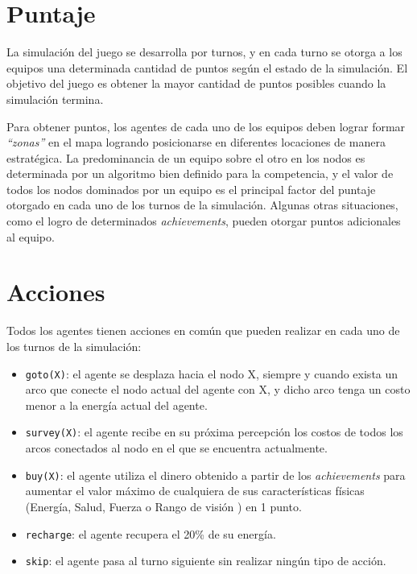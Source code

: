 \section{Puntaje}

La simulación del juego se desarrolla por turnos, y en cada turno se otorga 
a los equipos una determinada cantidad de puntos según el estado de la 
simulación. El objetivo del juego es obtener la mayor cantidad de puntos 
posibles cuando la simulación termina.

Para obtener puntos, los agentes de cada uno de los equipos deben lograr 
formar \textit{``zonas''} en el mapa logrando posicionarse en diferentes 
locaciones de manera estratégica. La predominancia de un equipo sobre el 
otro en los nodos es determinada por un algoritmo bien definido para la 
competencia, y el valor de todos los nodos dominados por un equipo es el 
principal factor del puntaje otorgado en cada uno de los turnos de la 
simulación. Algunas otras situaciones, como el logro de determinados 
\textit{achievements}, pueden otorgar puntos adicionales al equipo.

\section{Acciones}

Todos los agentes tienen acciones en común que pueden realizar en cada uno 
de los turnos de la simulación:

\begin{itemize}
	\item \texttt{goto(X)}: el agente se desplaza hacia el nodo X, siempre 
    y cuando exista un arco que conecte el nodo actual del agente con X, y 
    dicho arco tenga un costo menor a la energía actual del agente.
	\item \texttt{survey(X)}: el agente recibe en su próxima percepción los 
    costos de todos los arcos conectados al nodo en el que se encuentra 
    actualmente.
	\item \texttt{buy(X)}: el agente utiliza el dinero obtenido a partir de 
    los \textit{achievements} para aumentar el valor máximo de cualquiera 
    de sus características físicas (Energía, Salud, Fuerza o Rango de visión
    ) en 1 punto.
	\item \texttt{recharge}: el agente recupera el 20\% de su energía.
	\item \texttt{skip}: el agente pasa al turno siguiente sin realizar 
    ningún tipo de acción.
\end{itemize}

